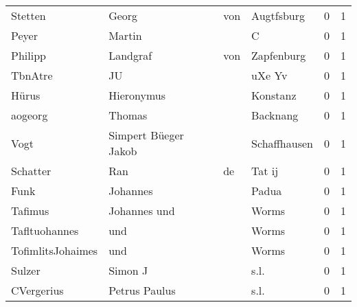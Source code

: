 \begin{center}
\begin{tiny}
\begin{longtabu}{llllrr}
                  Stetten &                              Georg &         von &                                  Augtfsburg &          0 &         1 \\
                    Peyer &                             Martin &             &                                           C &          0 &         1 \\
                  Philipp &                           Landgraf &         von &                                  Zapfenburg &          0 &         1 \\
                  TbnAtre &                                 JU &             &                                      uXe Yv &          0 &         1 \\
                    Hürus &                         Hieronymus &             &                                    Konstanz &          0 &         1 \\
                  aogeorg &                             Thomas &             &                                    Backnang &          0 &         1 \\
                     Vogt &               Simpert Büeger Jakob &             &                                Schaffhausen &          0 &         1 \\
                 Schatter &                                Ran &          de &                                      Tat ij &          0 &         1 \\
                     Funk &                           Johannes &             &                                       Padua &          0 &         1 \\
                  Tafimus &                       Johannes und &             &                                       Worms &          0 &         1 \\
            Tafltuohannes &                                und &             &                                       Worms &          0 &         1 \\
        TofimlitsJohaimes &                                und &             &                                       Worms &          0 &         1 \\
                   Sulzer &                            Simon J &             &                                        s.l. &          0 &         1 \\
               CVergerius &                      Petrus Paulus &             &                                        s.l. &          0 &         1 \\

\end{longtabu}
\end{tiny}
\end{center}
